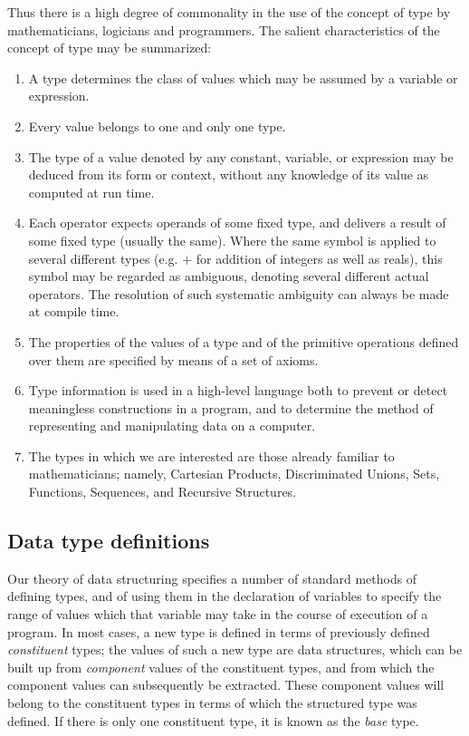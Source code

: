 Thus there is a high degree of commonality in the use of the concept of type by mathematicians, logicians and programmers. The salient characteristics of the concept of type may be summarized:

\begin{enumerate}[leftmargin=2\parindent, label=(\arabic*)]
	\item A type determines the class of values which may be assumed by a variable or expression.
	\item Every value belongs to one and only one type.
	\item The type of a value denoted by any constant, variable, or expression may be deduced from its form or context, without any knowledge of its value as computed at run time.
	\item Each operator expects operands of some fixed type, and delivers a result of some fixed type (usually the same). Where the same symbol is applied to several different types (e.g. $+$ for addition of integers as well as reals), this symbol may be regarded as ambiguous, denoting several different actual operators. The resolution of such systematic ambiguity can always be made 	at compile time.
	\item  The properties of the values of a type and of the primitive operations defined over them are specified by means of a set of axioms.
	\item Type information is used in a high-level language both to prevent or detect meaningless constructions in a program, and to determine the method of representing and manipulating data on a computer.
	\item The types in which we are interested are those already familiar to mathematicians; namely, Cartesian Products, Discriminated Unions, Sets, Functions, Sequences, and Recursive Structures.
\end{enumerate}

\subsection{Data type definitions}

Our theory of data structuring specifies a number of standard methods of defining types, and of using them in the declaration of variables to specify the range of values which that variable may take in the course of execution of a program. In most cases, a new type is defined in terms of previously defined \textit{constituent} types; the values of such a new type are data structures, which can be built up from \textit{component} values of the constituent types, and from which the component values can subsequently be extracted. These component values will belong to the constituent types in terms of which the structured type was defined. If there is only one constituent type, it is known as the \textit{base} type.

